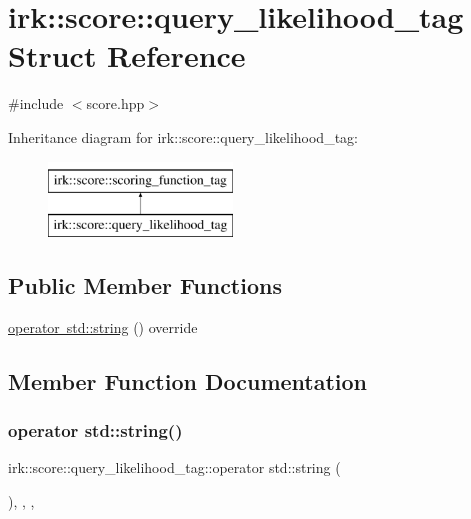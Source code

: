 \hypertarget{structirk_1_1score_1_1query__likelihood__tag}{}\section{irk\+:\+:score\+:\+:query\+\_\+likelihood\+\_\+tag Struct Reference}
\label{structirk_1_1score_1_1query__likelihood__tag}


{\ttfamily \#include $<$score.\+hpp$>$}

Inheritance diagram for irk\+:\+:score\+:\+:query\+\_\+likelihood\+\_\+tag\+:\begin{figure}[H]
\begin{center}
\leavevmode
\includegraphics[height=2.000000cm]{structirk_1_1score_1_1query__likelihood__tag}
\end{center}
\end{figure}
\subsection*{Public Member Functions}
\begin{DoxyCompactItemize}
\item 
\mbox{\hyperlink{structirk_1_1score_1_1query__likelihood__tag_af0559f12be12863cf0fe6a6df56829f8}{operator std\+::string}} () override
\end{DoxyCompactItemize}


\subsection{Member Function Documentation}
\mbox{\label{structirk_1_1score_1_1query__likelihood__tag_af0559f12be12863cf0fe6a6df56829f8}} 
\subsubsection{\texorpdfstring{operator std\+::string()}{operator std::string()}}
{\footnotesize\ttfamily irk\+::score\+::query\+\_\+likelihood\+\_\+tag\+::operator std\+::string (\begin{DoxyParamCaption}{ }\end{DoxyParamCaption})\hspace{0.3cm}{\ttfamily [inline]}, {\ttfamily [explicit]}, {\ttfamily [override]}, {\ttfamily [virtual]}}



